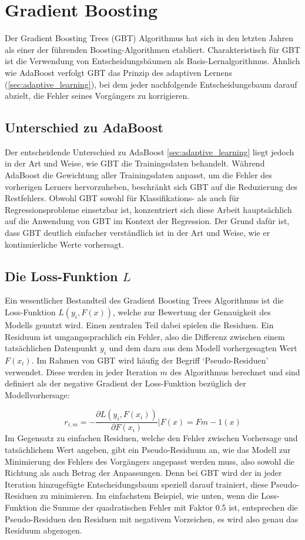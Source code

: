 \section{Gradient Boosting}
Der Gradient Boosting Trees (GBT) Algorithmus hat sich in den letzten Jahren als einer der führenden Boosting-Algorithmen etabliert. Charakteristisch für GBT ist die Verwendung von Entscheidungsbäumen als Basis-Lernalgorithmus. Ähnlich wie AdaBoost verfolgt GBT das Prinzip des adaptiven Lernens (\autoref{sec:adaptive_learning}), bei dem jeder nachfolgende Entscheidungsbaum darauf abzielt, die Fehler seines Vorgängers zu korrigieren.

\subsection{Unterschied zu AdaBoost}
Der entscheidende Unterschied zu AdaBoost \ref{sec:adaptive_learning} liegt jedoch in der Art und Weise, wie GBT die Trainingsdaten behandelt. Während AdaBoost die Gewichtung aller Trainingsdaten anpasst, um die Fehler des vorherigen Lerners hervorzuheben, beschränkt sich GBT auf die Reduzierung des Restfehlers.
\newline
Obwohl GBT sowohl für Klassifikations- als auch für Regressionsprobleme einsetzbar ist, konzentriert sich diese Arbeit hauptsächlich auf die Anwendung von GBT im Kontext der Regression. Der Grund dafür ist, dass GBT deutlich einfacher verständlich ist in der Art und Weise, wie er kontinuierliche Werte vorhersagt.


\subsection{Die Loss-Funktion \( L \)}
\label{sec:loss_funtion}
Ein wesentlicher Bestandteil des Gradient Boosting Trees Algorithmus ist die Loss-Funktion \( L(y_i,F(x)) \), welche zur Bewertung der Genauigkeit des Modells genutzt wird. Einen zentralen Teil dabei spielen die Residuen. Ein Residuum ist umgangssprachlich ein Fehler, also die Differenz zwischen einem tatsächlichen Datenpunkt \( y_i \) und dem dazu aus dem Modell vorhergesagten Wert \( F(x_i) \).
Im Rahmen von GBT wird häufig der Begriff `Pseudo-Residuen' verwendet. Diese werden in jeder Iteration \( m \) des Algorithmus berechnet und sind definiert als der negative Gradient der Loss-Funktion bezüglich der Modellvorhersage:

\begin{equation}
    \label{eq:residuum_general}
    r_{i,m} = -\frac{\partial L(y_i, F(x_i))}{\partial F(x_i)}\bigg|{F(x)=F{m-1}(x)}
\end{equation}
Im Gegensatz zu einfachen Residuen, welche den Fehler zwischen Vorhersage und tatsächlichem Wert angeben, gibt ein Pseudo-Residuum an, wie das Modell zur Minimierung des Fehlers des Vorgängers angepasst werden muss, also sowohl die Richtung als auch Betrag der Anpassungen. Denn bei GBT wird der in jeder Iteration hinzugefügte Entscheidungsbaum speziell darauf trainiert, diese Pseudo-Residuen zu minimieren.
Im einfachstem Beispiel, wie unten, wenn die Loss-Funktion die Summe der quadratischen Fehler mit Faktor 0.5 ist, entsprechen die Pseudo-Residuen den Residuen mit negativem Vorzeichen, es wird also genau das Residuum abgezogen.


